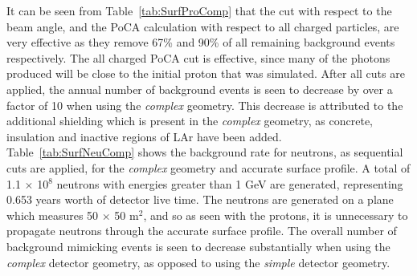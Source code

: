 It can be seen from Table~\ref{tab:SurfProComp} that the cut with respect to the beam angle, and the PoCA calculation with respect to all charged particles, are very effective as they remove 67\% and 90\% of all remaining background events respectively. The all charged PoCA cut is effective, since many of the photons produced will be close to the initial proton that was simulated. After all cuts are applied, the annual number of background events is seen to decrease by over a factor of 10 when using the \emph{complex} geometry. This decrease is attributed to the additional shielding which is present in the \emph{complex} geometry, as concrete, insulation and inactive regions of LAr have been added. \\

Table~\ref{tab:SurfNeuComp} shows the background rate for neutrons, as sequential cuts are applied, for the \emph{complex} geometry and accurate surface profile. A total of 1.1 $\times$ 10$^8$ neutrons with energies greater than 1 GeV are generated, representing 0.653 years worth of detector live time. The neutrons are generated on a plane which measures 50 $\times$ 50 m$^{2}$, and so as seen with the protons, it is unnecessary to propagate neutrons through the accurate surface profile. The overall number of background mimicking events is seen to decrease substantially when using the \emph{complex} detector geometry, as opposed to using the \emph{simple} detector geometry. \\


